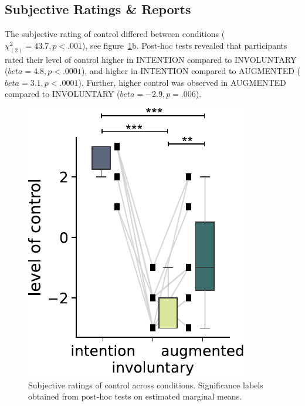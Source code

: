 \subsection{Subjective Ratings \& Reports}
The subjective rating of control differed between conditions (${\chi^{2}_{(2)}} = 43.7, p < .001$), see figure~\ref{fig:loc}b. Post-hoc tests revealed that participants rated their level of control higher in INTENTION compared to INVOLUNTARY ($beta = 4.8, p < .0001$), and higher in INTENTION compared to AUGMENTED ($beta = 3.1, p < .0001$). Further, higher control was observed in AUGMENTED compared to INVOLUNTARY ($beta = -2.9, p = .006$).


\begin{figure}[h]
    \centering
    \includegraphics[width=.5\columnwidth]{figures/level_of_control.pdf}
    \caption{Subjective ratings of control across conditions. Significance labels obtained from post-hoc tests on estimated marginal means.}
    \label{fig:loc}
\end{figure}

